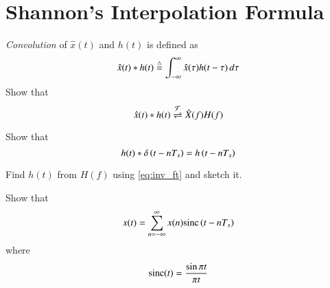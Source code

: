 \documentclass[journal,12pt,twocolumn]{IEEEtran}
\begin{document}
\section{Shannon's Interpolation Formula}
\begin{problem}
{\em Convolution} of $\hat{x}(t)$ and $h(t)$ is defined as
\begin{equation}
\hat{x}(t)*h(t) \stackrel{\triangle}{=} \int_{-\infty}^{\infty}\hat{x}(\tau)h(t -\tau) \, d\tau
\end{equation}
Show that
\begin{equation}
\hat{x}(t)*h(t) \overset{\mathcal{F}}{ \rightleftharpoons} \hat{X}(f)H(f)
\end{equation}
\end{problem}
\begin{problem}
Show that
\begin{equation}
h(t)*\delta\left(t-nT_s\right) = h\left(t-nT_s\right)
\end{equation}
\end{problem}
\begin{problem}
Find $h(t)$ from $H(f)$ using \eqref{eq:inv_ft} and sketch it.
\end{problem}
\begin{problem}
Show that
\begin{equation}
x(t) = \sum_{n = -\infty}^{\infty} x(n) \text{sinc} \left(t - nT_s\right)
\end{equation}
where
\begin{equation}
\text{sinc}(t) = \frac{\sin \pi t}{\pi t}
\end{equation}
\end{problem}
\end{document}
